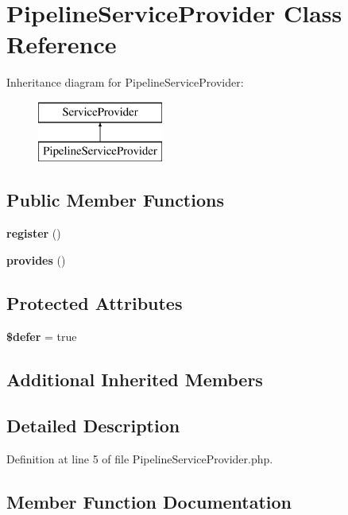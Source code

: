 \section{Pipeline\+Service\+Provider Class Reference}
\label{class_illuminate_1_1_pipeline_1_1_pipeline_service_provider}
Inheritance diagram for Pipeline\+Service\+Provider\+:\begin{figure}[H]
\begin{center}
\leavevmode
\includegraphics[height=2.000000cm]{class_illuminate_1_1_pipeline_1_1_pipeline_service_provider}
\end{center}
\end{figure}
\subsection*{Public Member Functions}
\begin{DoxyCompactItemize}
\item 
{\bf register} ()
\item 
{\bf provides} ()
\end{DoxyCompactItemize}
\subsection*{Protected Attributes}
\begin{DoxyCompactItemize}
\item 
{\bf \$defer} = true
\end{DoxyCompactItemize}
\subsection*{Additional Inherited Members}


\subsection{Detailed Description}


Definition at line 5 of file Pipeline\+Service\+Provider.\+php.



\subsection{Member Function Documentation}
